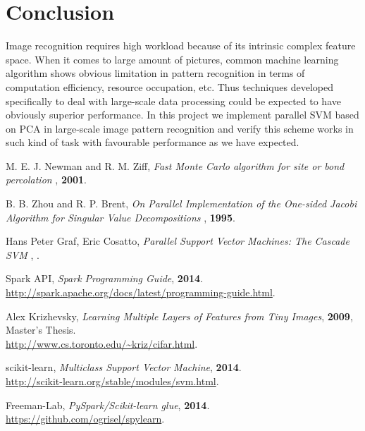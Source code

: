 \documentclass[a4paper]{article}
\begin{document}
\section{Conclusion}
Image recognition requires high workload because of its intrinsic complex feature space. When it comes to large amount of pictures, common machine learning algorithm shows obvious limitation in pattern recognition in terms of computation efficiency, resource occupation, etc. Thus techniques developed specifically to deal with large-scale data processing could be expected to have obviously superior performance. In this project we implement parallel SVM based on PCA in large-scale image pattern recognition and verify this scheme works in such kind of task with favourable performance as we have expected. 


\begin{thebibliography}{}

 M. E. J. Newman and R. M. Ziff, \emph{Fast Monte Carlo algorithm for site or bond percolation
}, \textbf{2001}.

 B. B. Zhou and R. P. Brent, \emph{On Parallel Implementation of the One-sided Jacobi Algorithm for Singular Value Decompositions
}, \textbf{1995}.

 Hans Peter Graf, Eric Cosatto, \emph{Parallel Support Vector Machines: The Cascade SVM
}, \textbf{}.

 Spark API, \emph{Spark Programming Guide}, \textbf{2014}.\\
\url{http://spark.apache.org/docs/latest/programming-guide.html}.

 Alex Krizhevsky, \emph{Learning Multiple Layers of Features from Tiny Images}, \textbf{2009}, Master's Thesis.\\
\url{http://www.cs.toronto.edu/~kriz/cifar.html}.

 scikit-learn, \emph{Multiclass Support Vector Machine}, \textbf{2014}.\\
\url{http://scikit-learn.org/stable/modules/svm.html}.

 Freeman-Lab, \emph{PySpark/Scikit-learn glue}, \textbf{2014}.\\
\url{https://github.com/ogrisel/spylearn}.
\end{thebibliography}
\end{document}
